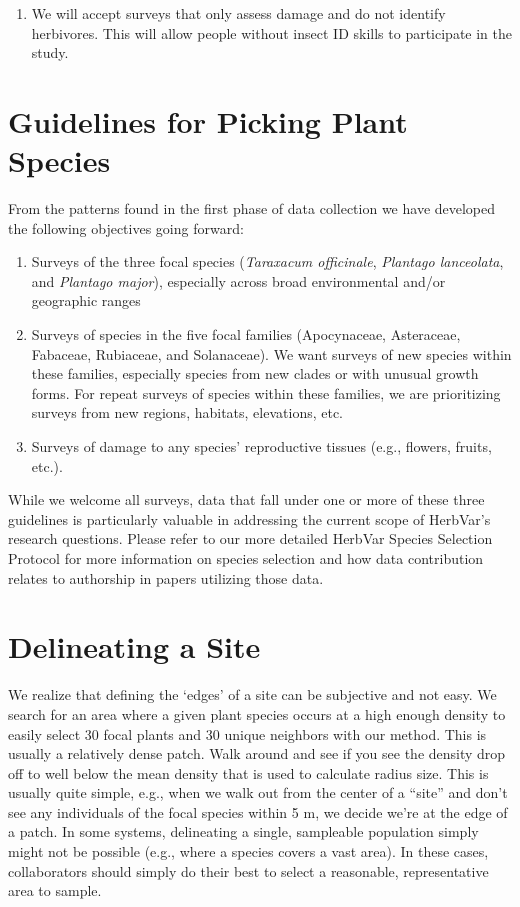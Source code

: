 \documentclass[
  letterpaper,
  DIV=11,
  numbers=noendperiod]{scrreprt}
\providecommand{\tightlist}{%
  \setlength{\itemsep}{0pt}\setlength{\parskip}{0pt}}\usepackage{longtable,booktabs,array}
\begin{document}
\begin{enumerate}
\def\labelenumi{\arabic{enumi}.}
\setcounter{enumi}{6}
\tightlist
\item
  We will accept surveys that only assess damage and do not identify
  herbivores. This will allow people without insect ID skills to
  participate in the study.
\end{enumerate}

\section{Guidelines for Picking Plant
Species}\label{guidelines-for-picking-plant-species-1}

From the patterns found in the first phase of data collection we have
developed the following objectives going forward:

\begin{enumerate}
\def\labelenumi{\arabic{enumi}.}
\item
  Surveys of the three focal species (\emph{Taraxacum officinale},
  \emph{Plantago lanceolata}, and \emph{Plantago major}), especially
  across broad environmental and/or geographic ranges
\item
  Surveys of species in the five focal families (Apocynaceae,
  Asteraceae, Fabaceae, Rubiaceae, and Solanaceae). We want surveys of
  new species within these families, especially species from new clades
  or with unusual growth forms. For repeat surveys of species within
  these families, we are prioritizing surveys from new regions,
  habitats, elevations, etc.
\item
  Surveys of damage to any species' reproductive tissues (e.g., flowers,
  fruits, etc.).
\end{enumerate}

While we welcome all surveys, data that fall under one or more of these
three guidelines is particularly valuable in addressing the current
scope of HerbVar's research questions. Please refer to our more detailed
HerbVar Species Selection Protocol for more information on species
selection and how data contribution relates to authorship in papers
utilizing those data.

\section{Delineating a Site}\label{delineating-a-site}

We realize that defining the `edges' of a site can be subjective and not
easy. We search for an area where a given plant species occurs at a high
enough density to easily select 30 focal plants and 30 unique neighbors
with our method. This is usually a relatively dense patch. Walk around
and see if you see the density drop off to well below the mean density
that is used to calculate radius size. This is usually quite simple,
e.g., when we walk out from the center of a ``site'' and don't see any
individuals of the focal species within 5 m, we decide we're at the edge
of a patch. In some systems, delineating a single, sampleable population
simply might not be possible (e.g., where a species covers a vast area).
In these cases, collaborators should simply do their best to select a
reasonable, representative area to sample.
\end{document}
